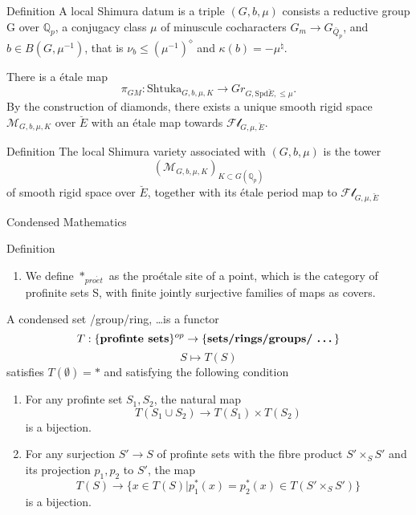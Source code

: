 \documentclass[aspectratio=1610]{ctexbeamer}
\def  \et       {\acute{e}t}
\def  \Shtuka   {\mathrm{Shtuka}}
\def  \cm       {\mathcal{M}}
\def  \bq       {\mathbb{Q}}
\begin{document}
\begin{frame}

\begin{block}{Definition}
	A local Shimura datum is a triple $(G, b , \mu)$ consists a reductive group G over $\bq_p$, a conjugacy class $\mu$ of minuscule cocharacters $G_m \to G_{\bar{Q}_p}$, and $ b \in B(G, \mu^{-1})$, that is $\nu_b \leq (\mu^{-1})^{\diamond}$ and $\kappa(b)= - \mu^{\natural}$.
\end{block}


There is a  \'etale map
$$
\pi_{GM}:  \Shtuka_{G,b,\mu,K} \to  Gr_{G, \mathrm{Spd} \breve{E}, \leq \mu}.
$$
By the construction of diamonds, there exists a unique smooth rigid space $\cm_{G,b, \mu, K}$ over $\breve{E}$ with an \'etale map towards $\mathscr{Fl}_{G, \mu, \breve{E}}$.


\begin{block}{Definition}
	The local Shimura variety associated with $(G, b, \mu)$ is the tower
	$$
	(\cm_{G,b,\mu, K})_{K \subset G(\bq_p)}
	$$
	of smooth rigid space over $\breve{E}$, together with its \'etale period map to $\mathscr{Fl}_{G, \mu, \breve{E}}$
\end{block}
\end{frame}












\begin{frame}{Condensed Mathematics}
\begin{block}{Definition}
	
	\begin{enumerate}
		\item We define $*_{pro\et}$ as the pro\'etale site of a point,  which is the category of profinite sets S,  with
		finite jointly surjective families of maps as covers.
	\end{enumerate}
\end{block}
 A condensed set /group/ring, \dots  is a functor
$$
T:  \{\textbf{profinte sets}\}^{op}   \to \{\textbf{sets/rings/groups/ \dots}\}
$$
$$
S \mapsto T(S)
$$
satisfies $T(\emptyset) = *$ and satisfying the following condition
\begin{enumerate}
	\item  For any profinte set $S_1, S_2$, the natural map
	$$
	T(S_1 \cup S_2) \to T(S_1) \times T(S_2)
	$$
	is a bijection.
	\item For any surjection $S' \to S $ of profinte sets with the fibre product $S' \times_S S'$ and its projection $p_1,  p_2$ to $S'$, the map
	$$
	T(S) \to \{x \in T(S)| p^*_1(x)=p_2^*(x)  \in T(S' \times_S S')\}
	$$
	is a bijection.
\end{enumerate}

\end{frame}
\end{document}

